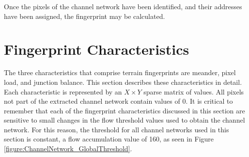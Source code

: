Once the pixels of the channel network have been identified, and their addresses have been assigned, the fingerprint may be calculated.



\section{Fingerprint Characteristics}
\label{section:FingerprintCharacteristics}


The three characteristics that comprise terrain fingerprints are
meander, pixel load, and junction balance. This section describes these characteristics in detail. Each characteristic is represented by an $X \times Y$ sparse matrix of values. All pixels not part of the extracted channel network contain values of 0. 
% 
It is critical to remember that each of the fingerprint characteristics discussed in this section are sensitive to small changes in the flow threshold values used to obtain the channel network. For this reason, the threshold for all channel networks used in this section is constant, a flow accumulation value of 160,
as seen in Figure \ref{figure:ChannelNetwork_GlobalThreshold}.

